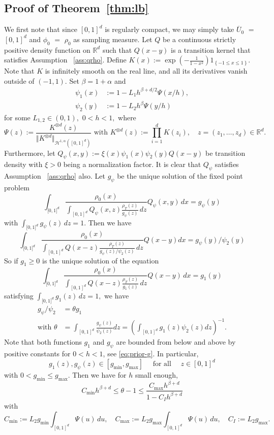 \documentclass[a4paper,11pt]{amsart}
\theoremstyle{plain}
\theoremstyle{remark}
\begin{document}
\subsection{Proof of Theorem~\ref{thm:lb}}

We first note that since $[0,1]^{d}$ is regularly compact, we may simply take $\overline U_{0}$ $=$ $[0,1]^{d}$ and $\phi_0$ $=$ $\rho_0$ as sampling measure. 
Let $Q$ be a continuous
strictly positive density function on $\mathbb{R}^{d}$ such that $Q(x-y)$ is a
transition kernel that satisfies Assumption ~\ref{ass:qrho}. Define
$K(x):=\exp\left(  -\frac{1}{1-x^{2}}\right)  1_{\left\{  -1\leq
x\leq1\right\}  }.$ Note that $K$ is infinitely smooth on the real line, and
all its derivatives vanish outside of $(-1,1).$ Set $\beta=1+\alpha$ and
\begin{align*}
\psi_{1}(x) &  :=1-L_{1}h^{\beta+d/2}\Psi(x/h),\\
\psi_{2}(y) &  :=1-L_{2}h^{\beta}\Psi(y/h)
\end{align*}
for some $L_{1,2}\in(0,1),$ $0<h<1,$ where
\[
\Psi(z):=\frac{K^{\otimes d}(z)}{\Vert K^{\otimes d}\Vert_{\mathcal{H}%
^{1,\alpha}([0,1]^{d})}}\text{ \ \ with \ \ }K^{\otimes d}(z):=\prod
_{i=1}^{d}K(z_{i}),\quad z=(z_{1},\ldots,z_{d})\in\mathbb{R}^{d}.
\]
Furthermore, let $Q_{\psi}(x,y):=\xi(x)\psi_{1}(x)\psi_{2}(y)Q(x-y)$ be
transition density with $\xi>0$ being a normalization factor. It is clear that
$Q_{\psi}$ satisfies Assumption ~\ref{ass:qrho} also. Let $g_{\psi}$ be the
unique solution of the fixed point problem
\[
\int_{\lbrack0,1]^{d}}\frac{\rho_{0}(x)}{\int_{[0,1]^{d}}Q_{\psi}%
(x,z)\frac{\rho_{T}(z)}{g_{\psi}(z)}\,dz}Q_{\psi}(x,y)\,dx=g_{\psi}(y)
\]
with $\int_{\lbrack0,1]^{d}} g_{\psi}(z)\,dz=1$. Then we have%
\[
\int_{\lbrack0,1]^{d}}\frac{\rho_{0}(x)}{\int_{[0,1]^{d}}Q(x-z)\frac{\rho
_{T}(z)}{g_{\psi}(z)/\psi_{2}(z)}\,dz}Q(x-y)dx=g_{\psi}(y)/\psi_{2}(y)
\]
So if $g_{1}\geq0$ is the unique solution of the equation
\[
\int_{\lbrack0,1]^{d}}\frac{\rho_{0}(x)}{\int_{[0,1]^{d}}Q(x-z)\frac{\rho
_{T}(z)}{g_{1}(z)}\,dz}Q(x-y)\,dx=g_{1}(y)
\]
satisfying $\int_{\lbrack0,1]^{d}} g_{1}(z)\,dz=1,$ we have
\begin{align*}
g_{\psi}/\psi_{2} &  =\theta g_{1}\text{ \ \ }\\
\text{with }\theta &  =\int_{[0,1]^{d}}\frac{g_{\psi}(z)}{\psi_{2}%
(z)}dz=\left(  \int_{[0,1]^{d}}g_{1}(z)\psi_{2}(z)dz\right)  ^{-1}.
\end{align*}
Note that both functions $g_{1}$ and $g_{\psi}$ are bounded from below and
above by positive constants for $0<h<1$, see \eqref{eq:prior-g}.
In particular, 
\begin{equation}
    g_1(z),g_\psi(z) \in [g_{\min}, g_{\max}] \quad \text{ for all } \quad  z \in [0, 1]^d \label{eq:g1-gpsi-bounds}
\end{equation}
with $0 < g_{\min} \leq g_{\max}.$
Then we have for $h$ small enough,
$$
C_{\min} h^{\beta + d} \leq \theta - 1 \leq \frac{C_{\max} h^{\beta + d}}{1 - C_I h^{\beta + d}}
$$
with
$$
C_{\min} := L_2 g_{\min} \int_{[0, 1]^d} \Psi(u)\, du, \quad C_{\max} := L_2 g_{\max} \int_{[0, 1]^d} \Psi(u)\, du, \quad C_I := L_2  g_{\max}.
$$
\end{document}
